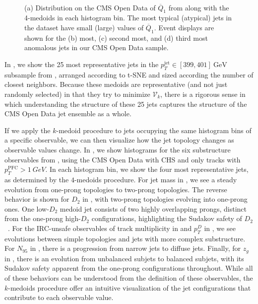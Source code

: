 \documentclass[aps,prd,twocolumn,preprintnumbers,nofootinbib,longbibliography,floatfix,superscriptaddress]{revtex4-1}
\begin{document}
\begin{figure*}[t]
\centering
\\
\caption{
(a) Distribution on the CMS Open Data of $\overline{Q}_1$ from  along with the 4-medoids in each histogram bin.
%
The most typical (atypical) jets in the dataset have small (large) values of $\overline{Q}_1$.
%
Event displays are shown for the (b) most, (c) second most, and (d) third most anomalous jets in our CMS Open Data sample.
}
\label{fig:kmedoidsemd} 
\end{figure*}


In , we show the 25 most representative jets in the $p_T^\text{jet}\in[399,401]~\text{GeV}$ subsample from , arranged according to t-SNE and sized according the number of closest neighbors.
%
Because these medoids are representative (and not just randomly selected) in that they try to minimize $\mathcal{V}_k$, there is a rigorous sense in which understanding the structure of these 25 jets captures the structure of the CMS Open Data jet ensemble as a whole.


If we apply the $k$-medoid procedure to jets occupying the same histogram bins of a specific observable, we can then visualize how the jet topology changes as observable values change.
%
In , we show histograms for the six substructure observables from , using the CMS Open Data with CHS and only tracks with $p_T^\text{PFC} > \SI{1}{GeV}$.
%
In each histogram bin, we show the four most representative jets, as determined by the $4$-medoids procedure.
%
For jet mass in , we see a steady evolution from one-prong topologies to two-prong topologies.
%
The reverse behavior is shown for $D_2$ in , with two-prong topologies evolving into one-prong ones.
%
One low-$D_2$ medoid jet consists of two highly overlapping prongs, distinct from the one-prong high-$D_2$ configurations, highlighting the Sudakov safety of $D_2$~\cite{Larkoski:2014gra,Larkoski:2015lea}.
%
For the IRC-unsafe observables of track multiplicity in  and $p_T^D$ in , we see evolutions between simple topologies and jets with more complex substructure.
%
For $N_{95}$ in , there is a progression from narrow jets to diffuse jets.
%
Finally, for $z_g$ in , there is an evolution from unbalanced subjets to balanced subjets, with its Sudakov safety apparent from the one-prong configurations throughout.
%
While all of these behaviors can be understood from the definition of these observables, the $k$-medoids procedure offer an intuitive visualization of the jet configurations that contribute to each observable value.
\end{document}
